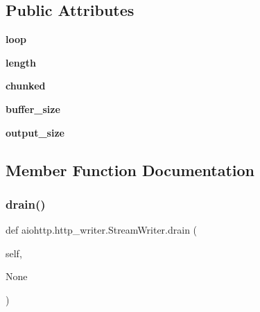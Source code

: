 \subsection*{Public Attributes}
\begin{DoxyCompactItemize}
\item 
\mbox{\label{classaiohttp_1_1http__writer_1_1_stream_writer_ad7d5b08bef49817df72567415d24bb30}} 
{\bfseries loop}
\item 
\mbox{\label{classaiohttp_1_1http__writer_1_1_stream_writer_aede39331e38ab0cd6cc595c59ee1b122}} 
{\bfseries length}
\item 
\mbox{\label{classaiohttp_1_1http__writer_1_1_stream_writer_a506ba6d6c5914530f47b9c9e8375cd74}} 
{\bfseries chunked}
\item 
\mbox{\label{classaiohttp_1_1http__writer_1_1_stream_writer_ae699983f60bc475928271988b2ff994b}} 
{\bfseries buffer\+\_\+size}
\item 
\mbox{\label{classaiohttp_1_1http__writer_1_1_stream_writer_aa3ddf3a6bbb94695b23a089994757ba0}} 
{\bfseries output\+\_\+size}
\end{DoxyCompactItemize}


\subsection{Member Function Documentation}
\mbox{\label{classaiohttp_1_1http__writer_1_1_stream_writer_a5db49131b819dbe234ea180010417b05}} 
\subsubsection{\texorpdfstring{drain()}{drain()}}
{\footnotesize\ttfamily def aiohttp.\+http\+\_\+writer.\+Stream\+Writer.\+drain (\begin{DoxyParamCaption}\item[{}]{self,  }\item[{}]{None }\end{DoxyParamCaption})}

